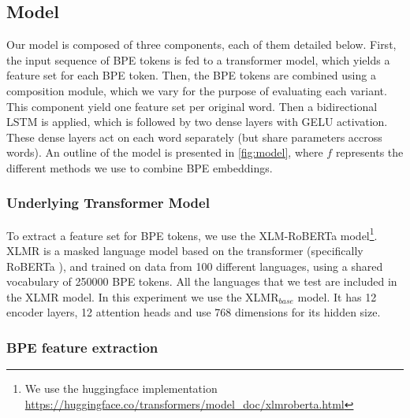 \documentclass[11pt]{article}
\newcommand\citep{\cite}
\begin{document}
	\subsection{Model}

        Our model is composed of three components, each of them
        detailed below. First, the input sequence of BPE tokens is fed
        to a transformer model, which yields a feature set for each
        BPE token. Then, the BPE tokens are combined using a
        composition module, which we vary for the purpose of
        evaluating each variant. This component yield one feature set
        per original word. Then a bidirectional LSTM is applied, which
        is followed by two dense layers with GELU \citep{hendrycks2016gaussian}
        activation. These dense layers act on each word separately (but
        share parameters accross words).  An outline of the model is
        presented in \cref{fig:model}, where $f$ represents the
        different methods we use to combine BPE embeddings.

	\subsubsection{Underlying Transformer Model}
     To extract a feature set for BPE tokens, we use the
     XLM-RoBERTa \cite{conneau2019unsupervised} model\footnote{We use the
     huggingface implementation
     \url{https://huggingface.co/transformers/model_doc/xlmroberta.html}}. XLMR
     is a masked language model based on the transformer
     (specifically RoBERTa \citep{liu2019roberta}), and trained on
     data from 100 different languages, using a shared vocabulary of
     250000 BPE tokens. All the languages that we test are included in the
     XLMR model. In this experiment we use the \textsc{XLMR}$_{base}$
     model. It has 12 encoder layers, 12 attention heads and use 768
     dimensions for its hidden size.

	\subsubsection{BPE feature extraction}
        \label{sec:bpe-features}

\end{document}
